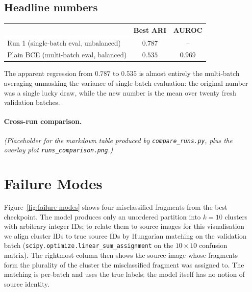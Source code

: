 \documentclass[12pt, a4paper]{article}
\begin{document}
\subsection{Headline numbers}

\begin{center}
\begin{tabular}{lcc}
\toprule
                                          & \textbf{Best ARI}  & \textbf{AUROC} \\
\midrule
Run 1 (single-batch eval, unbalanced)     & $0.787$            & --             \\
Plain BCE (multi-batch eval, balanced)    & $0.535$            & $0.969$        \\
\bottomrule
\end{tabular}
\end{center}

The apparent regression from $0.787$ to $0.535$ is almost entirely the
multi-batch averaging unmasking the variance of single-batch evaluation:
the original number was a single lucky draw, while the new number is the
mean over twenty fresh validation batches.

\paragraph{Cross-run comparison.}
\emph{(Placeholder for the markdown table produced by \texttt{compare\_runs.py},
plus the overlay plot \texttt{runs\_comparison.png}.)}

\section{Failure Modes}

Figure~\ref{fig:failure-modes} shows four misclassified fragments from the
best checkpoint. The model produces only an unordered partition into $k = 10$
clusters with arbitrary integer IDs; to relate them to source images for
this visualisation we align cluster IDs to true source IDs by Hungarian
matching on the validation batch
(\texttt{scipy.optimize.linear\_sum\_assignment} on the $10 \times 10$
confusion matrix). The rightmost column then shows the source image whose
fragments form the plurality of the cluster the misclassified fragment was
assigned to. The matching is per-batch and uses the true labels; the model
itself has no notion of source identity.


\end{document}
